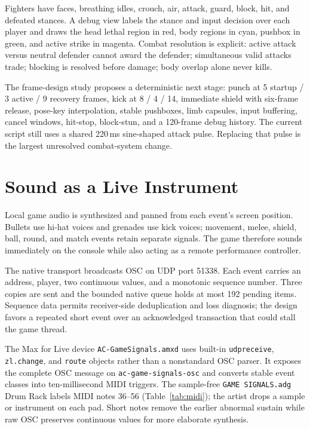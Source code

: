 \documentclass[10pt,letterpaper,twocolumn]{article}
\newcommand{\code}[1]{\texttt{#1}}
\begin{document}
Fighters have faces, breathing idles, crouch, air, attack, guard, block, hit, and defeated stances. A debug view labels the stance and input decision over each player and draws the head lethal region in red, body regions in cyan, pushbox in green, and active strike in magenta. Combat resolution is explicit: active attack versus neutral defender cannot award the defender; simultaneous valid attacks trade; blocking is resolved before damage; body overlap alone never kills.

The frame-design study proposes a deterministic next stage: punch at 5 startup / 3 active / 9 recovery frames, kick at 8 / 4 / 14, immediate shield with six-frame release, pose-key interpolation, stable pushboxes, limb capsules, input buffering, cancel windows, hit-stop, block-stun, and a 120-frame debug history. The current script still uses a shared 220\,ms sine-shaped attack pulse. Replacing that pulse is the largest unresolved combat-system change.

\section{Sound as a Live Instrument}

Local game audio is synthesized and panned from each event's screen position. Bullets use hi-hat voices and grenades use kick voices; movement, melee, shield, ball, round, and match events retain separate signals. The game therefore sounds immediately on the console while also acting as a remote performance controller.

The native transport broadcasts OSC on UDP port 51338. Each event carries an address, player, two continuous values, and a monotonic sequence number. Three copies are sent and the bounded native queue holds at most 192 pending items. Sequence data permits receiver-side deduplication and loss diagnosis; the design favors a repeated short event over an acknowledged transaction that could stall the game thread.

The Max for Live device \code{AC-GameSignals.amxd} uses built-in \code{udpreceive}, \code{zl.change}, and \code{route} objects rather than a nonstandard OSC parser. It exposes the complete OSC message on \code{ac-game-signals-osc} and converts stable event classes into ten-millisecond MIDI triggers. The sample-free \code{GAME SIGNALS.adg} Drum Rack labels MIDI notes 36--56 (Table~\ref{tab:midi}); the artist drops a sample or instrument on each pad. Short notes remove the earlier abnormal sustain while raw OSC preserves continuous values for more elaborate synthesis.
\end{document}
